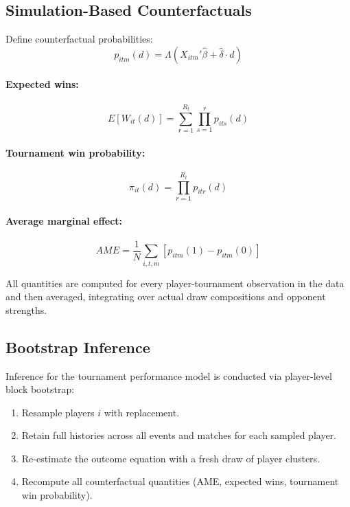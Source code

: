 \subsection{Simulation-Based Counterfactuals}
\label{app:simulation}

Define counterfactual probabilities:
\begin{equation}
p_{itm}(d) = \Lambda(X_{itm}'\hat{\beta} + \hat{\delta} \cdot d)
\end{equation}

\paragraph{Expected wins:}
\begin{equation}
E[W_{it}(d)] = \sum_{r=1}^{R_t} \prod_{s=1}^{r} p_{its}(d)
\end{equation}

\paragraph{Tournament win probability:}
\begin{equation}
\pi_{it}(d) = \prod_{r=1}^{R_t} p_{itr}(d)
\end{equation}

\paragraph{Average marginal effect:}
\begin{equation}
AME = \frac{1}{N} \sum_{i,t,m}
\left[ p_{itm}(1) - p_{itm}(0) \right]
\end{equation}

All quantities are computed for every player-tournament observation in the data and then averaged, integrating over actual draw compositions and opponent strengths.

\subsection{Bootstrap Inference}
\label{app:bootstrap}

Inference for the tournament performance model is conducted via player-level block bootstrap:

\begin{enumerate}
\item Resample players $i$ with replacement.
\item Retain full histories across all events and matches for each sampled player.
\item Re-estimate the outcome equation with a fresh draw of player clusters.
\item Recompute all counterfactual quantities (AME, expected wins, tournament win probability).
\end{enumerate}

